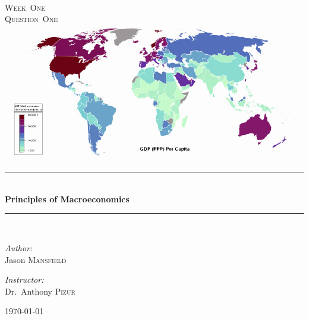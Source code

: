 \documentclass[pdftex,12pt,a4paper]{report}
\newcommand{\HRule}{\rule{\linewidth}{0.5mm}}
\begin{document}
%
\begin{titlepage}
\begin{center}


\textsc{\color{Sepia}{\LARGE EC~320}}\\[1.5cm]
\textsc{\Large Week~One}\\[0.5cm]
\textsc{\Large Question~One}\\[0.5cm]
\includegraphics[scale=0.5]{GDP}\\
\cite{wiki:001}
\HRule \\[0.4cm]
{ \huge \bfseries Principles of Macroeconomics}\\[0.4cm]
\HRule \\[1.5cm]


\begin{minipage}{0.4\textwidth}
\begin{flushleft} \large
\emph{Author:}\\
Jason \textsc{Mansfield}
\end{flushleft}
\end{minipage}
\begin{minipage}{0.4\textwidth}
\begin{flushright} \large
\emph{Instructor:} \\
Dr.~Anthony \textsc{Pizur}
\end{flushright}
\end{minipage}

\vfill

{\large \today}

\end{center}
\end{titlepage}
%
\end{document}
